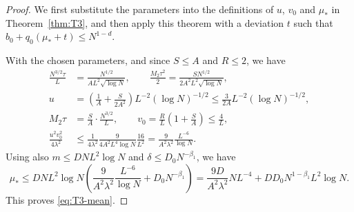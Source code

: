 \begin{proof}
We first substitute the parameters into the definitions of $u$, $v_0$
and $\mu_*$ in Theorem~\ref{thm:T3}, and then apply this theorem with a
deviation $t$ such that $b_0+q_0(\mu_*+t)\leq N^{1-d}$.

With the chosen parameters, and since $S\leq A$ and $R\leq2$, we have
\begin{align*}
 \frac{N^{3/2}\tau}L
 &=\frac{N^{1/2}}{AL^2\sqrt{\log N}},\qquad
 \frac{M_2\tau^2}2
 =\frac{SN^{1/2}}{2A^2L^2\sqrt{\log N}},\\
 u
 &=\left(\frac1A+\frac{S}{2A^2}\right)
                 L^{-2}(\log N)^{-1/2}
 \leq\frac3{2A}L^{-2}(\log N)^{-1/2},\\
 M_2\tau
 &=\frac SA\cdot\frac{N^{3/2}}L,\qquad
 v_0
 =\frac RL\left(1+\frac SA\right)
 \leq\frac4L,\\
 \frac{u^2v_0^2}{4\lambda^2}
 &\leq\frac1{4\lambda^2}
       \frac9{4A^2L^4\log N}\frac{16}{L^2}
 =\frac9{A^2\lambda^2}\frac{L^{-6}}{\log N}.
\end{align*}
Using also $m\leq DNL^2\log N$ and $\delta\leq D_0N^{-\beta_1}$, we have
\[
 \mu_*
 \leq DNL^2\log N
      \left(\frac9{A^2\lambda^2}\frac{L^{-6}}{\log N}
                   +D_0N^{-\beta_1}\right)
 =\frac{9D}{A^2\lambda^2}NL^{-4}
      +DD_0N^{1-\beta_1}L^2\log N.
\]
This proves \eqref{eq:T3-mean}.


\end{proof}
